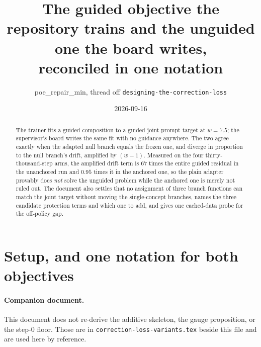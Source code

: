 \documentclass[11pt]{article}
\title{The guided objective the repository trains and the unguided one the board writes,\\
reconciled in one notation}
\author{poe\_repair\_min, thread off \texttt{designing-the-correction-loss}}
\date{2026-09-16}
\theoremstyle{plain}
\theoremstyle{remark}
\begin{document}
\maketitle

\begin{abstract}
The trainer fits a guided composition to a guided joint-prompt target at $w = 7.5$; the
supervisor's board writes the same fit with no guidance anywhere. The two agree exactly when the
adapted null branch equals the frozen one, and diverge in proportion to the null branch's drift,
amplified by $(w-1)$. Measured on the four thirty-thousand-step arms, the amplified drift term is
$67$ times the entire guided residual in the unanchored run and $0.95$ times it in the anchored
one, so the plain adapter provably does \emph{not} solve the unguided problem while the anchored
one is merely not ruled out. The document also settles that no assignment of three branch
functions can match the joint target without moving the single-concept branches, names the three
candidate protection terms and which one to add, and gives one cached-data probe for the
off-policy gap.
\end{abstract}

\tableofcontents

\section{Setup, and one notation for both objectives}

\paragraph{Companion document.}
This document does not re-derive the additive skeleton, the gauge proposition, or the step-0
floor. Those are in \texttt{correction-loss-variants.tex} beside this file and are used here by
reference.
\end{document}
